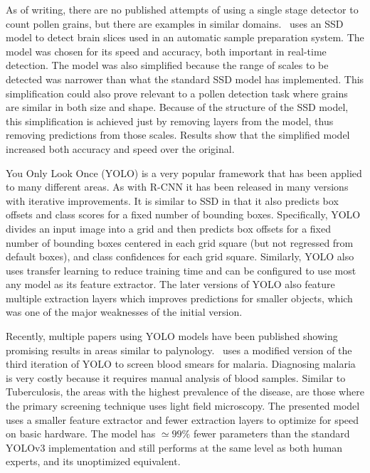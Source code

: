 As of writing, there are no published attempts of using a single stage detector to count pollen grains, but there are examples in similar domains.~\cite{liu_brain_2018} uses an SSD model to detect brain slices used in an automatic sample preparation system.
The model was chosen for its speed and accuracy, both important in real-time detection.
The model was also simplified because the range of scales to be detected was narrower than what the standard SSD model has implemented.
This simplification could also prove relevant to a pollen detection task where grains are similar in both size and shape.
Because of the structure of the SSD model, this simplification is achieved just by removing layers from the model, thus removing predictions from those scales.
Results show that the simplified model increased both accuracy and speed over the original.

You Only Look Once (YOLO) is a very popular framework that has been applied to many different areas.
As with R-CNN it has been released in many versions with iterative improvements.
It is similar to SSD in that it also predicts box offsets and class scores for a fixed number of bounding boxes.
Specifically, YOLO divides an input image into a grid and then predicts box offsets for a fixed number of bounding boxes centered in each grid square (but not regressed from default boxes), and class confidences for each grid square.
Similarly, YOLO also uses transfer learning to reduce training time and can be configured to use most any model as its feature extractor.
The later versions of YOLO also feature multiple extraction layers which improves predictions for smaller objects, which was one of the major weaknesses of the initial version.

Recently, multiple papers using YOLO models have been published showing promising results in areas similar to palynology.~\cite{chibuta_real_time_2020} uses a modified version of the third iteration of YOLO to screen blood smears for malaria.
Diagnosing malaria is very costly because it requires manual analysis of blood samples.
Similar to Tuberculosis, the areas with the highest prevalence of the disease, are those where the primary screening technique uses light field microscopy.
The presented model uses a smaller feature extractor and fewer extraction layers to optimize for speed on basic hardware.
The model has \( \simeq 99\% \) fewer parameters than the standard YOLOv3 implementation and still performs at the same level as both human experts, and its unoptimized equivalent.


